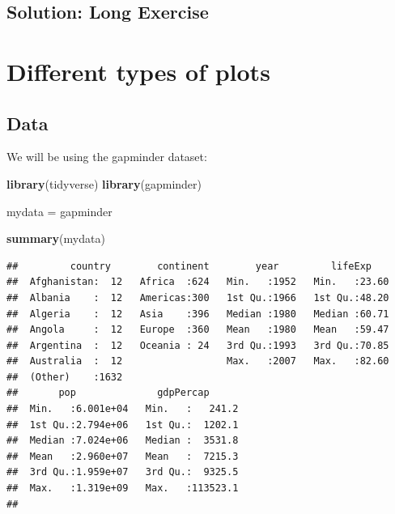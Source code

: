 \documentclass[12pt,]{krantz}
\makeatletter
\newenvironment{Shaded}{\begin{snugshade}}{\end{snugshade}}
\newcommand{\DataTypeTok}[1]{\textcolor[rgb]{0.13,0.29,0.53}{#1}}
\newcommand{\DecValTok}[1]{\textcolor[rgb]{0.00,0.00,0.81}{#1}}
\newcommand{\KeywordTok}[1]{\textcolor[rgb]{0.13,0.29,0.53}{\textbf{#1}}}
\newcommand{\NormalTok}[1]{#1}
\newcommand{\OperatorTok}[1]{\textcolor[rgb]{0.81,0.36,0.00}{\textbf{#1}}}
\newcommand{\StringTok}[1]{\textcolor[rgb]{0.31,0.60,0.02}{#1}}
\newenvironment{kframe}{%
\medskip{}
\setlength{\fboxsep}{.8em}
 \def\at@end@of@kframe{}%
 \ifinner\ifhmode%
  \def\at@end@of@kframe{\end{minipage}}%
  \begin{minipage}{\columnwidth}%
 \fi\fi%
 \def\FrameCommand##1{\hskip\@totalleftmargin \hskip-\fboxsep
 \colorbox{shadecolor}{##1}\hskip-\fboxsep
     \hskip-\linewidth \hskip-\@totalleftmargin \hskip\columnwidth}%
 \MakeFramed {\advance\hsize-\width
   \@totalleftmargin\z@ \linewidth\hsize
   \@setminipage}}%
 {\par\unskip\endMakeFramed%
 \at@end@of@kframe}
\renewenvironment{Shaded}{\begin{kframe}}{\end{kframe}}
\theoremstyle{definition}
\theoremstyle{definition}
\theoremstyle{definition}
\theoremstyle{remark}
\makeatother
\begin{document}
\hypertarget{solution-long-exercise}{%
\section{Solution: Long Exercise}\label{solution-long-exercise}}

\begin{Shaded}
\end{Shaded}

\hypertarget{different-types-of-plots}{%
\chapter{Different types of plots}\label{different-types-of-plots}}

\hypertarget{data-2}{%
\section{Data}\label{data-2}}

We will be using the gapminder dataset:

\begin{Shaded}
\begin{Highlighting}[]
\KeywordTok{library}\NormalTok{(tidyverse)}
\KeywordTok{library}\NormalTok{(gapminder)}

\NormalTok{mydata =}\StringTok{ }\NormalTok{gapminder}

\KeywordTok{summary}\NormalTok{(mydata)}
\end{Highlighting}
\end{Shaded}

\begin{verbatim}
##         country        continent        year         lifeExp     
##  Afghanistan:  12   Africa  :624   Min.   :1952   Min.   :23.60  
##  Albania    :  12   Americas:300   1st Qu.:1966   1st Qu.:48.20  
##  Algeria    :  12   Asia    :396   Median :1980   Median :60.71  
##  Angola     :  12   Europe  :360   Mean   :1980   Mean   :59.47  
##  Argentina  :  12   Oceania : 24   3rd Qu.:1993   3rd Qu.:70.85  
##  Australia  :  12                  Max.   :2007   Max.   :82.60  
##  (Other)    :1632                                                
##       pop              gdpPercap       
##  Min.   :6.001e+04   Min.   :   241.2  
##  1st Qu.:2.794e+06   1st Qu.:  1202.1  
##  Median :7.024e+06   Median :  3531.8  
##  Mean   :2.960e+07   Mean   :  7215.3  
##  3rd Qu.:1.959e+07   3rd Qu.:  9325.5  
##  Max.   :1.319e+09   Max.   :113523.1  
## 
\end{verbatim}
\end{document}
